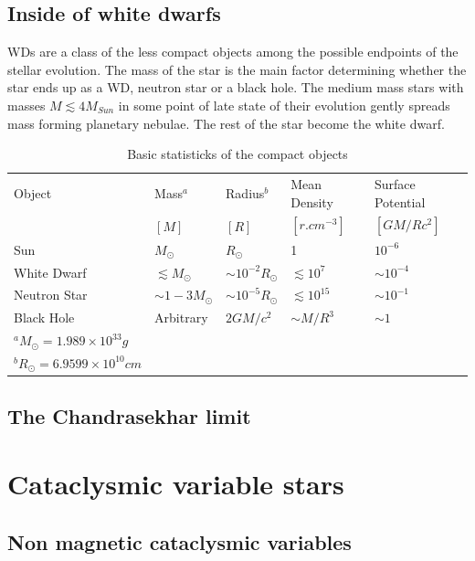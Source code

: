 \documentclass[oneside,a4paper,11pt]{report}
\begin{document}
\section{Inside of white dwarfs}
WDs are a class of the less compact objects among the possible endpoints of the stellar evolution. 
The mass of the star is the main factor determining whether the star ends up as a WD, neutron star or a black hole.
The medium mass stars with masses $M \lesssim  4M_{Sun}$ in some point of late state of their evolution gently spreads mass
 forming planetary nebulae. The rest of the star become the white dwarf.  

\begin{table}[ht!]
\caption{Basic statisticks of the compact objects}
\centering
\begin{tabular}{lllll}
\hline
\hline
Object & Mass$^a$ & Radius$^b$ & Mean Density & Surface Potential  \\
       & $[M]$ & $[R]$ & $[r.cm^{-3}]$& $[GM/Rc^2]$                    \\
\hline
Sun         & $M_{\odot}$            & $R_{\odot}$             &1                  &$10^{-6}$ \\
White Dwarf & $\lesssim M_{\odot}$   & $\sim 10^{-2}R_{\odot}$ & $\lesssim 10^7$   &$\sim 10^{-4}$ \\
Neutron Star& $\sim1-3M_{\odot}$     & $\sim 10^{-5}R_{\odot}$ & $\lesssim 10^{15}$& $\sim 10^{-1}$\\
Black Hole  & Arbitrary              & $2GM/c^2$               & $\sim M/R^3$      & $\sim1$\\
\hline
\footnotesize
$^a M_{\odot}=1.989 \times 10^{33} g$ &&&& \\
\footnotesize
$^b R_{\odot}=6.9599 \times 10^{10} cm$ &&&& \\
\end{tabular}
\label{comobj1}
\end{table}

\section{The Chandrasekhar limit}



\chapter{Cataclysmic variable stars}
\section{Non magnetic cataclysmic variables} 
\end{document}
